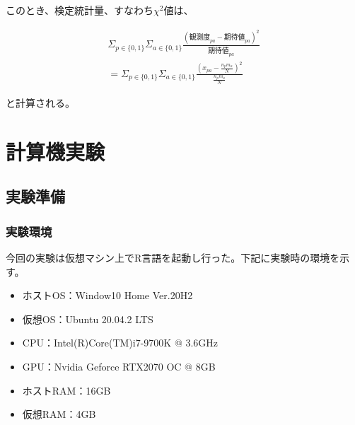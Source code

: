 \documentclass[dvipdfmx]{jsarticle}
\begin{document}
このとき、検定統計量、すなわち$χ^{2}値$は、
\begin{center}
  \begin{align*}
    \Sigma_{p \in \{0,1\}}\Sigma_{a \in \{0,1\}}\frac{(観測度_{pa}-期待値_{pa})^{2}}{期待値_{pa}}　\\
     = \Sigma_{p \in \{0,1\}}\Sigma_{a\in \{0,1\}}\frac{(x_{pa}-\frac{n_{p}m_{a}}{N})^{2}}{\frac{n_{p}m_{a}}{N}}
  \end{align*}
\end{center}
と計算される。





\section{計算機実験}
\subsection{実験準備}
  \subsubsection{実験環境}
  今回の実験は仮想マシン上でR言語を起動し行った。下記に実験時の環境を示す。
  \begin{itemize}
    \item ホストOS：Window10 Home Ver.20H2
    \item 仮想OS：Ubuntu 20.04.2 LTS
    \item CPU：Intel(R)Core(TM)i7-9700K @ 3.6GHz
    \item GPU：Nvidia Geforce RTX2070 OC @ 8GB
    \item ホストRAM：16GB
    \item 仮想RAM：4GB
  \end{itemize}
\end{document}
